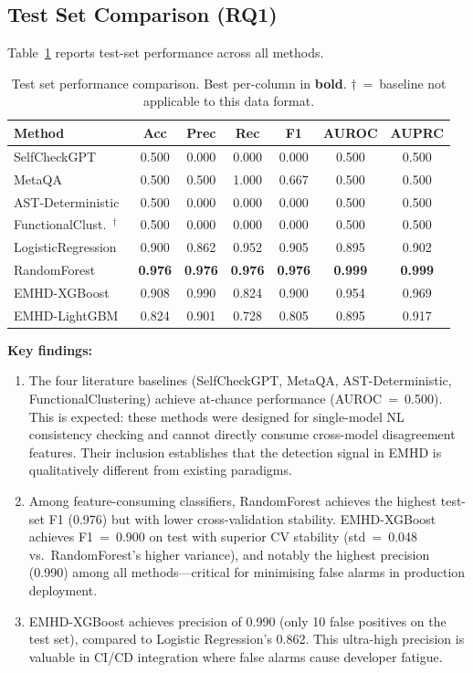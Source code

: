 \documentclass[runningheads]{llncs}
\newcommand{\method}{\textsc{EMHD}}
\begin{document}
\subsection{Test Set Comparison (RQ1)}

Table~\ref{tab:comparison} reports test-set performance across all methods.

\begin{table}[t]
\centering
\caption{Test set performance comparison. Best per-column in \textbf{bold}. $\dagger$~=~baseline not applicable to this data format.}
\label{tab:comparison}
\footnotesize
\begin{tabular}{lcccccc}
\toprule
\textbf{Method} & \textbf{Acc} & \textbf{Prec} & \textbf{Rec} & \textbf{F1} & \textbf{AUROC} & \textbf{AUPRC} \\
\midrule
SelfCheckGPT~\cite{manakul2023selfcheckgpt}     & 0.500 & 0.000 & 0.000 & 0.000 & 0.500 & 0.500 \\
MetaQA~\cite{yang2025metaqa}                     & 0.500 & 0.500 & 1.000 & 0.667 & 0.500 & 0.500 \\
AST-Deterministic~\cite{khati2026ast}            & 0.500 & 0.000 & 0.000 & 0.000 & 0.500 & 0.500 \\
FunctionalClust.~\cite{ravuri2025clustering}$^\dagger$ & 0.500 & 0.000 & 0.000 & 0.000 & 0.500 & 0.500 \\
\midrule
LogisticRegression & 0.900 & 0.862 & 0.952 & 0.905 & 0.895 & 0.902 \\
RandomForest       & \textbf{0.976} & \textbf{0.976} & \textbf{0.976} & \textbf{0.976} & \textbf{0.999} & \textbf{0.999} \\
\midrule
EMHD-XGBoost  & 0.908 & 0.990 & 0.824 & 0.900 & 0.954 & 0.969 \\
EMHD-LightGBM & 0.824 & 0.901 & 0.728 & 0.805 & 0.895 & 0.917 \\
\bottomrule
\end{tabular}
\end{table}

\noindent\textbf{Key findings:}
\begin{enumerate}
\item The four literature baselines (SelfCheckGPT, MetaQA, AST-Deterministic, FunctionalClustering) achieve at-chance performance (AUROC~=~0.500). This is expected: these methods were designed for single-model NL consistency checking and cannot directly consume cross-model disagreement features. Their inclusion establishes that the detection signal in \method{} is qualitatively different from existing paradigms.
\item Among feature-consuming classifiers, RandomForest achieves the highest test-set F1 (0.976) but with lower cross-validation stability. EMHD-XGBoost achieves F1~=~0.900 on test with superior CV stability (std~=~0.048 vs.\ RandomForest's higher variance), and notably the highest precision (0.990) among all methods---critical for minimising false alarms in production deployment.
\item EMHD-XGBoost achieves precision of 0.990 (only 10 false positives on the test set), compared to Logistic Regression's 0.862. This ultra-high precision is valuable in CI/CD integration where false alarms cause developer fatigue.
\end{enumerate}
\end{document}
